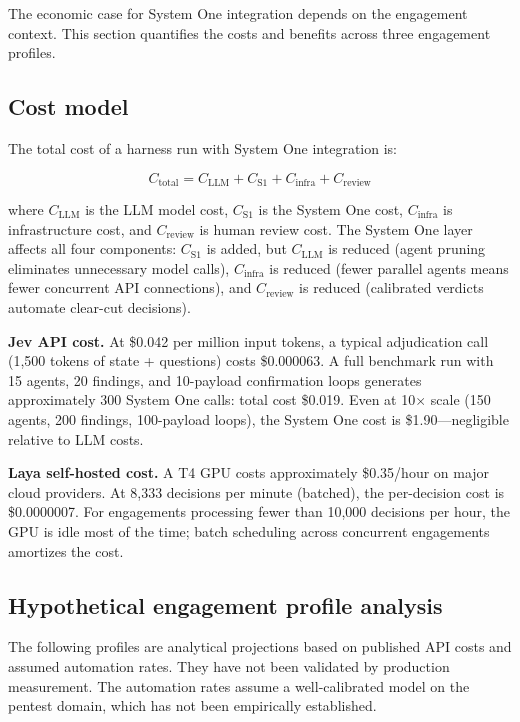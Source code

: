 \documentclass[conference]{IEEEtran}
\begin{document}
The economic case for System One integration depends on the engagement context. This section quantifies the costs and benefits across three engagement profiles.

\subsection{Cost model}

The total cost of a harness run with System One integration is:

\begin{equation}
C_{\text{total}} = C_{\text{LLM}} + C_{\text{S1}} + C_{\text{infra}} + C_{\text{review}}
\end{equation}

where $C_{\text{LLM}}$ is the LLM model cost, $C_{\text{S1}}$ is the System One cost, $C_{\text{infra}}$ is infrastructure cost, and $C_{\text{review}}$ is human review cost. The System One layer affects all four components: $C_{\text{S1}}$ is added, but $C_{\text{LLM}}$ is reduced (agent pruning eliminates unnecessary model calls), $C_{\text{infra}}$ is reduced (fewer parallel agents means fewer concurrent API connections), and $C_{\text{review}}$ is reduced (calibrated verdicts automate clear-cut decisions).

\textbf{Jev API cost.} At \$0.042 per million input tokens, a typical adjudication call (1,500 tokens of state + questions) costs \$0.000063. A full benchmark run with 15 agents, 20 findings, and 10-payload confirmation loops generates approximately 300 System One calls: total cost \$0.019. Even at 10$\times$ scale (150 agents, 200 findings, 100-payload loops), the System One cost is \$1.90---negligible relative to LLM costs.

\textbf{Laya self-hosted cost.} A T4 GPU costs approximately \$0.35/hour on major cloud providers. At 8,333 decisions per minute (batched), the per-decision cost is \$0.0000007. For engagements processing fewer than 10,000 decisions per hour, the GPU is idle most of the time; batch scheduling across concurrent engagements amortizes the cost.

\subsection{Hypothetical engagement profile analysis}

The following profiles are analytical projections based on published API costs and assumed automation rates. They have not been validated by production measurement. The automation rates assume a well-calibrated model on the pentest domain, which has not been empirically established.
\end{document}
